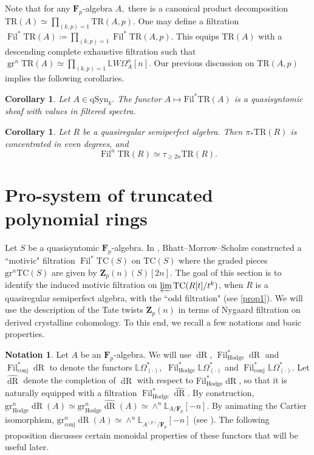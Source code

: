 \documentclass[10pt,letterpaper]{amsart}
\numberwithin{figure}{section}
\numberwithin{equation}{section}
\newtheorem{corollary}[figure]{Corollary}
\theoremstyle{definition}
\newtheorem{notation}[figure]{Notation}
\theoremstyle{definition}
\theoremstyle{definition}
\theoremstyle{definition}
\DeclareMathOperator{\gr}{gr}
\DeclareMathOperator{\conj}{conj}
\DeclareMathOperator{\Hodge}{Hodge}
\DeclareMathOperator{\Fil}{Fil}
\DeclareMathOperator{\dR}{dR}
\newcommand{\LL}{\L}
\newcommand{\TR}{\mathrm{TR}}
\newcommand{\TC}{\mathrm{TC}}
\renewcommand{\L}{\mathbb{L}}
\newcommand{\Z}{\mathbf{Z}}
\newcommand{\F}{\mathbf{F}}
\begin{document}
Note that for any $\F_p$-algebra $A,$ there is a canonical product decomposition $\TR(A) \simeq \prod_{(k,p)=1} \TR(A,p).$ One may define a filtration 
$ \Fil^* \TR(A) \coloneqq \prod_{(k,p)=1} \Fil^* \TR(A,p).$ This equips $\TR(A)$ with a descending complete exhaustive filtration such that $\gr^n \TR(A) \simeq \prod_{(k,p)=1}\L W\Omega^n_A [n].$ Our previous discussion on $\TR(A,p)$ implies the following corollaries.

\begin{corollary}\label{cor1}
    Let $A \in \mathrm{qSyn}_k.$ The functor $A \mapsto \mathrm{Fil}^* \TR(A)$ is a quasisyntomic sheaf with values in filtered spectra. 
\end{corollary}{}


\begin{corollary}\label{cor3}
    Let $R$ be a quasiregular semiperfect algebra. Then $\pi_* \TR(R)$ is concentrated in even degrees, and $$\Fil^n \TR(R) \simeq \tau_{\ge 2n} \TR(R).$$
\end{corollary}{}










\section{Pro-system of truncated polynomial rings}\label{sec3} 
Let $S$ be a quasisyntomic $\F_p$-algebra. In \cite{BMS2}, Bhatt--Morrow--Scholze constructed a ``motivic" filtration $\Fil^* \TC (S)$ on $\TC(S)$ where the graded pieces $\mathrm{gr}^n \TC(S)$ are given by $\Z_p (n)(S)[2n].$ The goal of this section is to identify the induced motivic filtration on $\varprojlim \mathrm{TC}(R[t]/t^k)$, when $R$ is a quasiregular semiperfect algebra, with the ``odd filtration" (see \cref{prop1}). We will use the description of the Tate twists $\Z_p(n)$ in terms of Nygaard filtration on derived crystalline cohomology. To this end, we recall a few notations and basic properties. 


\begin{notation}Let $A$ be an $\F_p$-algebra.
   We will use $\dR$, $\Fil^*_{\Hodge} \dR$ and $\Fil^*_{\conj} \dR$ to denote the functors $\L \Omega^*_{(\cdot)},$ $\Fil^*_{\Hodge}\L\Omega^*_{(\cdot)}$ and $\Fil^*_{\conj}\L\Omega^*_{(\cdot)}$. Let $\widehat{\dR}$ denote the completion of $\dR$ with respect to $\mathrm{Fil}^*_{\Hodge} \dR$, so that it is naturally equipped with a filtration $\Fil^*_{\Hodge} \widehat {\dR}.$ By construction, $\mathrm{gr}^n_{\Hodge} \dR(A) \simeq \mathrm{gr}^n_{\Hodge} \widehat{\dR}(A) \simeq \wedge^n\LL_{A/\F_p}[-n].$ By animating the Cartier isomorphism, $\mathrm{gr}^n_{\conj} \dR(A) \simeq \wedge^n \LL_{A^{(p)}/ \F_p}[-n]$ (see \cite[Prop.~3.5]{Bha12}). The following proposition discusses certain monoidal properties of these functors that will be useful later. 
\end{notation}{}
\end{document}
